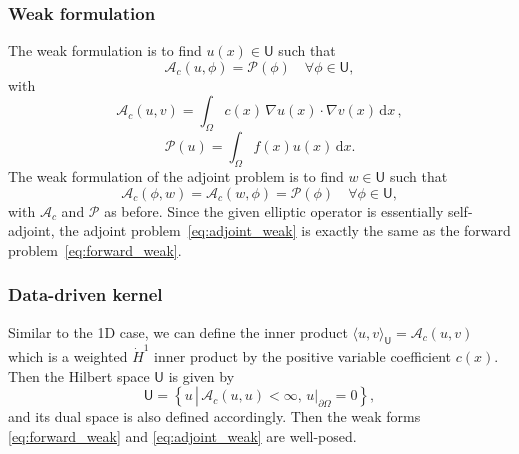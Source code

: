 \documentclass[12pt]{amsart}
\begin{document}
\subsubsection{Weak formulation}
The weak formulation is to find $u(x) \in \mathsf{U}$ such that
\begin{equation}\label{eq:forward_weak}
\mathcal{A}_c(u, \phi) = \mathcal{P}(\phi)\quad \forall \phi \in \mathsf{U},
\end{equation}
with
\[
\mathcal{A}_c(u,v) = \int_\Omega c(x)\, \nabla u(x) \cdot \nabla v(x) \,\mathrm{d}x\,,
\]
\[
\mathcal{P}(u) = \int_\Omega f(x) u(x)\, \mathrm{d}x.
\]
The weak formulation of the adjoint problem is to find $w \in \mathsf{U}$ such that
\begin{equation}\label{eq:adjoint_weak}
\mathcal{A}_c(\phi, w ) = \mathcal{A}_c ( w,\phi) = \mathcal{P}(\phi)\quad \forall \phi \in \mathsf{U},
\end{equation}
with $\mathcal{A}_c$ and $\mathcal{P}$ as before. Since the given elliptic operator is essentially self-adjoint, the adjoint problem~\eqref{eq:adjoint_weak} is exactly the same as the forward problem~\eqref{eq:forward_weak}.



\subsubsection{Data-driven kernel}
Similar to the 1D case,  we can define the inner product $\langle u, v \rangle_\mathsf{U}  = \mathcal{A}_c(u,v)$ which is a weighted $\dot{H}^1$ inner product by the positive variable coefficient $c(x)$. Then the Hilbert space $\mathsf{U}$  is given by
\[
\mathsf{U} = \left\{ u \, \left|\, \mathcal{A}_c(u,u) < \infty,
\, u|_{\partial \Omega} = 0\right.\right\},
\]
and its dual space is also defined accordingly. Then the weak forms \eqref{eq:forward_weak} and \eqref{eq:adjoint_weak} are well-posed.
\end{document}
